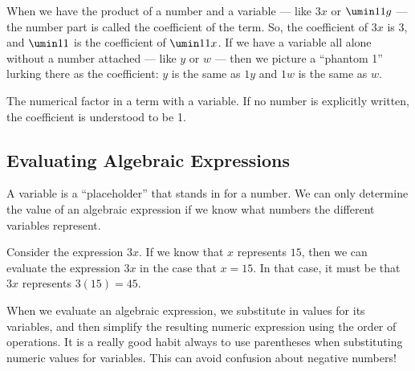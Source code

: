 When we have the product of a number and a variable --- like $3x$ or $\umin11g$ --- the number part is called the \gls{coefficient} of the term. So, the coefficient of $3x$ is 3, and $\umin11$ is the coefficient of $\umin11x$. If we have a variable all alone without a number attached --- like $y$ or $w$ --- then we picture a ``phantom 1'' lurking there as the coefficient: $y$ is the same as $1y$ and $1w$ is the same as $w$.

\begin{boxeddef}[Coefficient]
The numerical factor in a term with a variable. If no number is explicitly written, the coefficient is understood to be 1.
\end{boxeddef}

\subsection{Evaluating Algebraic Expressions}

A variable is a ``placeholder'' that stands in for a number. We can only determine the value of an algebraic expression if we know what numbers the different variables represent.

Consider the expression $3x$. If we know that $x$ represents $15$, then we can \gls{evaluate} the expression $3x$ in the case that $x = 15$. In that case, it must be that $3x$ represents $3(15) = 45$.

When we evaluate an algebraic expression, we substitute in values for its variables, and then simplify the resulting numeric expression using the order of operations. It is a really good habit always to use parentheses when substituting numeric values for variables. This can avoid confusion about negative numbers!

